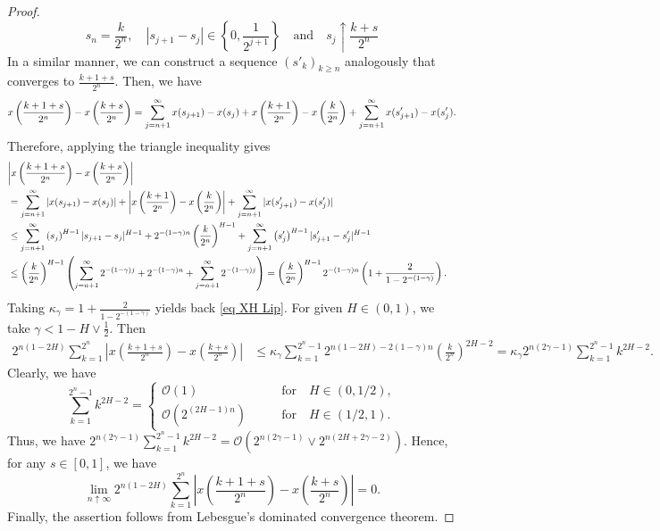 \documentclass[12pt,reqno]{article}
\def\ua{\uparrow}
\newcommand\scalemath[2]{\scalebox{#1}{\mbox{\ensuremath{\displaystyle #2}}}}
\numberwithin{equation}{section}
\theoremstyle{definition}
\def\ua{\uparrow}
\begin{document}
\begin{proof}
\begin{equation*}
		s_{n} = \frac{k}{2^{n}}, \quad |s_{j+1} - s_{j}| \in \left\{0,\frac{1}{2^{j+1}}\right\} \quad \text{and} \quad s_j \ua \frac{k+s}{2^n}
	\end{equation*}
	In a similar manner, we can construct a sequence $(s'_k)_{k \ge n}$ analogously that converges to $ \frac{k+1+s}{2^n}$. Then, we have 
	\begin{equation*}
		\scalemath{1}{x\left(\frac{k+1+s}{2^n}\right)-x\left(\frac{k+s}{2^n}\right) = \sum_{j = n+1}^{\infty}x(s_{j+1}) - x(s_{j})  + x\left(\frac{k+1}{2^n}\right)-x\left(\frac{k}{2^n}\right) + \sum_{j = n+1}^{\infty}x(s'_{j+1}) - x(s'_{j}).}
	\end{equation*}
	Therefore, applying the triangle inequality gives 
	\begin{align*}
		\lefteqn{\left|x\left(\frac{k+1+s}{2^n}\right)-x\left(\frac{k+s}{2^n}\right)\right|}\\ &= \sum_{j = n+1}^{\infty}|x(s_{j+1}) - x(s_{j})|  + \left|x\left(\frac{k+1}{2^n}\right)-x\left(\frac{k}{2^n}\right)\right| + \sum_{j = n+1}^{\infty}|x(s'_{j+1}) - x(s'_{j})|\\&\le \sum_{j = n+1}^\infty\left(s_j\right)^{H-1}|s_{j+1} - s_j|^{H-1} + 2^{-(1-\gamma)n}\left(\frac{k}{2^{n}}\right)^{H-1} + \sum_{j = n+1}^\infty\left(s'_j\right)^{H-1}|s'_{j+1} - s'_j|^{H-1} \\&\le\left( \frac{k}{2^n}\right)^{H-1}\left(\sum_{j = n+1}^{\infty} 2^{-(1-\gamma)j} + 2^{-(1-\gamma)n}+\sum_{j = n+1}^{\infty} 2^{-(1-\gamma)j} \right) = \left(\frac{k}{2^n}\right)^{H-1} 2^{-(1-\gamma)n}\left(1 + \frac{2}{1-2^{-(1-\gamma)}}\right).
	\end{align*}
	Taking $\kappa_\gamma = 1 + \frac{2}{1-2^{-(1-\gamma)}}$ yields back \eqref{eq XH Lip}. For given $H \in (0,1)$, we take $\gamma < 1 - H \vee \frac{1}{2}$. Then 
	\begin{equation*}
		\begin{split}
			2^{n(1-2H)}\sum_{k = 1}^{2^n}\left|x\left(\frac{k+1+s}{2^n}\right)-x\left(\frac{k+s}{2^n}\right)\right|  &\le \kappa_\gamma\sum_{k = 1}^{2^n-1} 2^{n(1-2H)-2(1-\gamma)n}\left(\frac{k}{2^{n}}\right)^{2H-2}= \kappa_\gamma2^{n(2\gamma-1)}\sum_{k = 1}^{2^n-1}k^{2H-2}.
		\end{split}
	\end{equation*}
	Clearly, we have 
	\begin{equation*}
		\sum_{k = 1}^{2^n-1}k^{2H-2} = \begin{cases}
			\mathcal{O}(1) &\qquad \text{for} \quad H \in (0,1/2),\\
			\mathcal{O}(2^{(2H-1)n}) &\qquad \text{for} \quad H \in (1/2,1).
		\end{cases}
	\end{equation*}
	Thus, we have $2^{n(2\gamma-1)}\sum_{k = 1}^{2^n-1}k^{2H-2} = \mathcal{O}(2^{n(2\gamma - 1)} \vee 2^{n(2H + 2\gamma -2)})$. Hence, for any $s \in [0,1]$, we have  
	\begin{equation*}
		\lim_{n \ua \infty} 2^{n(1-2H)}\sum_{k = 1}^{2^n}\left|x\left(\frac{k+1+s}{2^n}\right)-x\left(\frac{k+s}{2^n}\right)\right|   = 0.
	\end{equation*}
	Finally, the assertion follows from Lebesgue's dominated convergence theorem.
\end{proof}
\end{document}
